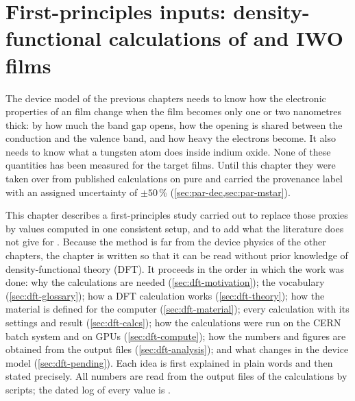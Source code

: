 \newenvironment{dftplain}{\par\medskip\noindent\textit{In plain words.}\ }{\par\medskip}

\chapter{First-principles inputs: density-functional calculations of \texorpdfstring{\InO}{In2O3} and IWO films}
\label{ch:dft}

The device model of the previous chapters needs to know how the electronic properties of an \IWO{} film change when
the film becomes only one or two nanometres thick: by how much the band gap opens, how the opening is shared between
the conduction and the valence band, and how heavy the electrons become. It also needs to know what a tungsten atom
does inside indium oxide. None of these quantities has been measured for the target films. Until this chapter they
were taken over from published calculations on pure \InO{} and carried the provenance label
 with an assigned uncertainty of $\pm50$\,\% (\cref{sec:par-dec,sec:par-mstar}).

This chapter describes a first-principles study carried out to replace those proxies by values computed in one
consistent setup, and to add what the literature does not give for \IWO. Because the method is far from the device
physics of the other chapters, the chapter is written so that it can be read without prior knowledge of
density-functional theory (DFT). It proceeds in the order in which the work was done: why the calculations are
needed (\cref{sec:dft-motivation}); the vocabulary (\cref{sec:dft-glossary}); how a DFT calculation works
(\cref{sec:dft-theory}); how the material is defined for the computer (\cref{sec:dft-material}); every calculation
with its settings and result (\cref{sec:dft-calcs}); how the calculations were run on the CERN batch system and on
GPUs (\cref{sec:dft-compute}); how the numbers and figures are obtained from the output files
(\cref{sec:dft-analysis}); and what changes in the device model (\cref{sec:dft-pending}). Each idea is first
explained in plain words and then stated precisely. All numbers are read from the output files of the calculations
by scripts; the dated log of every value is .

